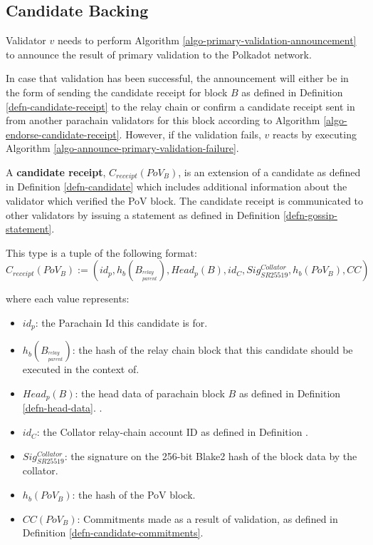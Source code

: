 \subsection{Candidate Backing}

\label{sect-primary-validaty-announcement}
Validator $v$ needs to perform Algorithm \ref{algo-primary-validation-announcement} to announce the result of primary validation to the Polkadot network.
\newline

In case that validation has been successful, the announcement will either be in
the form of sending the candidate receipt for block $B$ as defined in Definition
\ref{defn-candidate-receipt} to the relay chain or confirm a candidate receipt
sent in from another parachain validators for this block according to Algorithm
\ref{algo-endorse-candidate-receipt}. However, if the validation fails, $v$
reacts by executing Algorithm \ref{algo-announce-primary-validation-failure}.

\begin{definition}
  \label{defn-candidate-receipt}
  A \textbf{candidate receipt}, $C_{receipt}(PoV_B)$, is an extension of a candidate
  as defined in Definition \ref{defn-candidate} which includes additional
  information about the validator which verified the PoV block. The candidate
  receipt is communicated to other validators by issuing a statement as defined
  in Definition \ref{defn-gossip-statement}.
  \newline

  This type is a tuple of the following format:
  \[
  C_{receipt}(PoV_B) := (id_p, h_b({B_{^{relay}_{parent}}}), Head_p(B), id_{C}, Sig^{Collator}_{SR25519}, h_b({PoV_B}), CC)
  \]

  where each value represents:
  \begin{itemize}
    \item $id_p$: the Parachain Id this candidate is for.
    \item $h_b({B_{^{relay}_{parent}}})$: the hash of the relay chain block that this
    candidate should be executed in the context of.
    \item $Head_p(B)$: the head data of parachain block $B$ as defined in Definition \ref{defn-head-data}.
    .
    \item $id_C$: the Collator relay-chain account ID as defined in Definition
    .
    \item $Sig^{Collator}_{SR25519}$: the signature on the 256-bit Blake2 hash
    of the block data by the collator.
    \item $h_b({PoV_B})$: the hash of the PoV block.
    \item $CC(PoV_B)$: Commitments made as a result of validation, as defined in
    Definition \ref{defn-candidate-commitments}.
  \end{itemize}
\end{definition}

